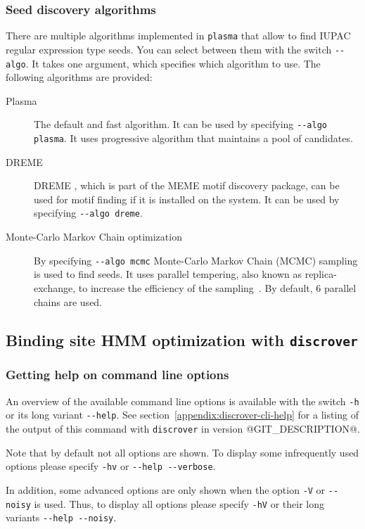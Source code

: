\documentclass[a4paper]{article}
\makeatletter
\newcommand{\plasma}[0]{\texttt{plasma}}
\newcommand{\discrover}[0]{\texttt{discrover}}
\newcommand{\version}[0]{@GIT_DESCRIPTION@}
\makeatother
\begin{document}
\subsubsection{Seed discovery algorithms}
There are multiple algorithms implemented in \plasma{} that allow to find IUPAC regular expression type seeds.
You can select between them with the switch \verb|--algo|.
It takes one argument, which specifies which algorithm to use.
The following algorithms are provided:
\begin{description}
  \item[Plasma]
    The default and fast algorithm.
    It can be used by specifying \verb|--algo plasma|.
    It uses progressive algorithm that maintains a pool of candidates.
  \item[DREME]
    DREME \cite{Bailey2011}, which is part of the MEME motif discovery package, can be used for motif finding if it is installed on the system.
    It can be used by specifying \verb|--algo dreme|.
  \item[Monte-Carlo Markov Chain optimization]
    By specifying \verb|--algo mcmc| Monte-Carlo Markov Chain (MCMC) sampling is used to find seeds.
    It uses parallel tempering, also known as replica-exchange, to increase the efficiency of the sampling~\cite{Earl2005}.
    By default, 6 parallel chains are used.
\end{description}

\subsection{Binding site HMM optimization with \discrover{}}
\label{subsection:running-discrover}
\subsubsection{Getting help on command line options}
An overview of the available command line options is available with the switch \verb|-h| or its long variant \verb|--help|.
See section~\ref{appendix:discrover-cli-help} for a listing of the output of this command with \discrover{} in version \version{}.

Note that by default not all options are shown.
To display some infrequently used options please specify \verb|-hv| or \verb|--help --verbose|.

In addition, some advanced options are only shown when the option \verb|-V| or \verb|--noisy| is used.
Thus, to display all options please specify \verb|-hV| or their long variants \verb|--help --noisy|.
\end{document}
